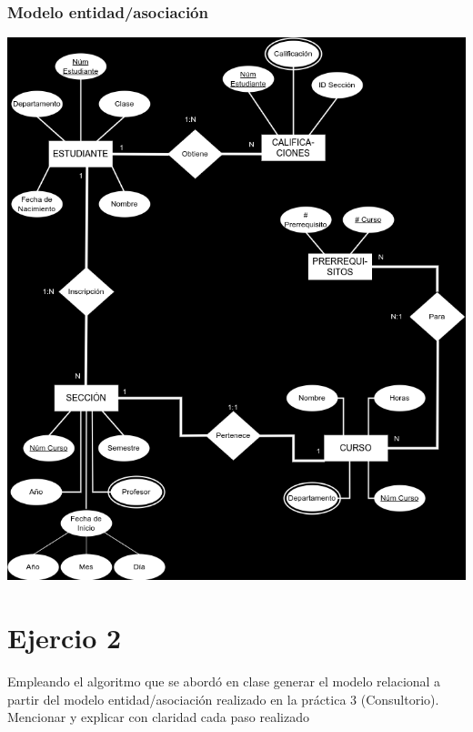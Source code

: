 \documentclass[a4paper,12pt]{article}
\begin{document}
\subsubsection*{Modelo entidad/asociación}
\begin{center}
    \includegraphics[scale = .5]{IMA/Ejercio1.png}    
\end{center}

\newpage
\section*{Ejercio 2}
\textcolor{sun}{Empleando el algoritmo que se abordó en clase generar el modelo
relacional a partir del modelo entidad/asociación realizado en la práctica 3 (Consultorio). Mencionar y explicar con claridad cada paso realizado}
\thispagestyle{fancy} %
\end{document}
